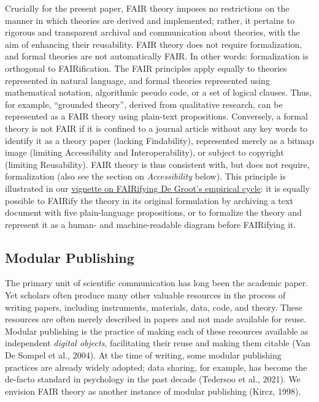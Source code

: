 \documentclass[man]{apa7}
\begin{document}
Crucially for the present paper,
FAIR theory imposes no restrictions on the manner in which theories are derived and implemented;
rather, it pertains to rigorous and transparent archival and communication about theories, with the aim of enhancing their reusability.
FAIR theory does not require formalization, and formal theories are not automatically FAIR.
In other words: formalization is orthogonal to FAIRification.
The FAIR principles
apply equally to theories represented in natural language,
and formal theories represented using mathematical notation, algorithmic pseudo code, or a set of logical clauses.
Thus, for example, ``grounded theory'', derived from qualitative research,
can be represented as a FAIR theory using plain-text propositions.
Conversely, a formal theory is not FAIR if it is confined to a journal article without any key words to identify it as a theory paper (lacking Findability), represented merely as a bitmap image (limiting Accessibility and Interoperability), or subject to copyright (limiting Reusability).
FAIR theory is thus consistent with, but does not require, formalization (also see the section on \emph{Accessibility} below).
This principle is illustrated in our \href{https://cjvanlissa.github.io/theorytools/articles/fair-theory.html}{vignette on FAIRifying De Groot's empirical cycle}:
it is equally possible to FAIRify the theory in its original formulation by archiving a text document with five plain-language propositions,
or to formalize the theory and represent it as a human- and machine-readable diagram before FAIRifying it.

\subsection{Modular Publishing}\label{modular-publishing}

\label{modularvalue}{The primary unit of scientific communication has long been the academic paper.
Yet scholars often produce many other valuable resources in the process of writing papers,
including instruments, materials, data, code, and theory.
These resources are often merely described in papers and not made available for reuse.
Modular publishing is the practice of making each of these resources available as independent \emph{digital objects},
facilitating their reuse and making them citable (Van De Sompel et al., 2004).
\label{datasharing}{At the time of writing, some modular publishing practices are already widely adopted;
data sharing, for example, has become the de-facto standard in psychology in the past decade (Tedersoo et al., 2021).}
We envision FAIR theory as another instance of modular publishing (Kircz, 1998).
}
\end{document}
